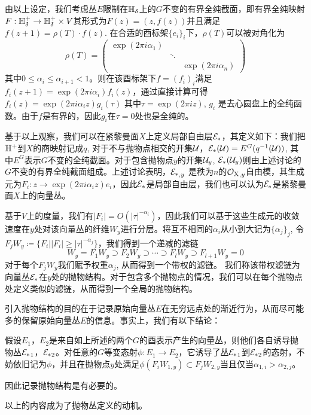 由以上设定，我们考虑丛$E$限制在$\mathbb{H}_\delta$上的$G$不变的有界全纯截面，即有界全纯映射$F:\mathbb{H}^+_\delta\to \mathbb{H}^+_\delta\times V$其形式为$F(z)=(z,f(z))$并且满足$f(z+1)=\rho(T)\cdot f(z)$. 在合适的酉标架$\{e_i\}_i$下，$\rho(T)$可以被对角化为
\[
\rho(T)=
\begin{pmatrix*}
    \exp(2\pi i \alpha_1) & &\\
    & \ddots & \\
    & & \exp(2\pi i \alpha_n)
\end{pmatrix*}
\]
其中$0\leq \alpha_i\leq\alpha_{i+1}<1$。则在该酉标架下$f=(f_i)_i$满足$f_i(z+1)=\exp(2\pi i \alpha_i)f_i(z)$，通过直接计算可得$f_i(z)=\exp(2\pi i \alpha_i z)g_i(\tau)$ 其中$\tau=\exp(2\pi i z)$, $g_i$ 是去心圆盘上的全纯函数。由于$f$是有界的，因此$g_i$在$\tau=0$处也是全纯的。

基于以上观察，我们可以在紧黎曼面$X$上定义局部自由层$\mathcal{E}_{*}$，其定义如下：我们把$\mathbb{H}^+$到$X$的商映射记成$q$, 对于不与抛物点相交的开集$\mathcal{U}$，$\mathcal{E}_{*}(\mathcal{U})=E^G(q^{-1}(\mathcal{U}))$, 其中$E^G$表示$G$不变的全纯截面。对于包含抛物点$y$的开集$\mathcal{U}_y$, $\mathcal{E}_{*}(\mathcal{U}_y)$则由上述讨论的$G$不变的有界全纯截面组成。上述讨论表明，${\mathcal{E}_{*}}_{,y}$ 是秩为$n$的${\operatorname{\mathcal{O}_X}}_{,y}$自由模，其生成元为$F_i: z\to \exp(2\pi i \alpha_i z)e_i$，因此$\mathcal{E}_{*}$是局部自由层，我们也可以认为$\mathcal{E}_{*}$是紧黎曼面$X$上的向量丛。

基于$V$上的度量，我们有$|F_i|=O(|\tau|^{-\alpha_i})$，因此我们可以基于这些生成元的收敛速度在$y$处对该向量丛的纤维$W_y$进行分层。将互不相同的$\alpha_i$从小到大记为$\{\alpha_j\}_j$, 令$F_jW_{y}\coloneqq\{F_i||F_i|\geq |\tau|^{-\alpha_j}\}$，我们得到一个递减的滤链
\[
 W_y=F_1W_{y}\supset F_2W_{y}\supset \cdots \supset F_lW_{y}\supset F_{l+1}W_{y}=0
\]
对于每个$F_jW_y$我们赋予权重$\alpha_j$, 从而得到一个带权的滤链。
我们称该带权滤链为向量丛$\mathcal{E}_{*}$在$y$处的抛物结构。对于包含多个抛物点的情况，我们可以在每个抛物点处定义类似的滤链，从而得到一个全局的抛物结构。

引入抛物结构的目的在于记录原始向量丛$E$在无穷远点处的渐近行为，从而尽可能多的保留原始向量丛$E$的信息。事实上，我们有以下结论：
\begin{proposition}
    假设$E_1$，$E_2$是来自如上所述的两个$G$的酉表示产生的向量丛，则他们各自诱导抛物丛${\mathcal{E}_{*}}_1$，${\mathcal{E}_{*}}_2$。对任意的$G$等变态射$\phi: E_1 \to E_2$，它诱导了丛${\mathcal{E}_{*}}_1$到${\mathcal{E}_{*}}_2$的态射，不妨依旧记为$\phi$，并且在抛物点$y$处满足$\phi(F_iW_{1,y})\subset F_jW_{2,y}$当且仅当$\alpha_{1,i}>\alpha_{2,j}$。
\end{proposition}
因此记录抛物结构是有必要的。

以上的内容成为了抛物丛定义的动机。
